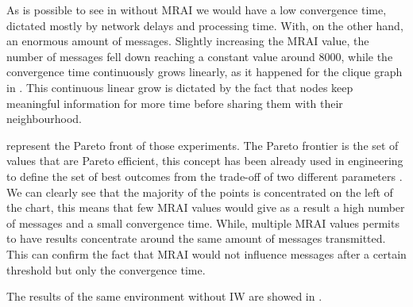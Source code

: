 As is possible to see in 
without \ac{MRAI} we would have a low convergence time, dictated mostly by
network delays and processing time. With, on the other hand, an enormous amount
of messages.
Slightly increasing the \ac{MRAI} value, the number of messages fell down
reaching a constant value around \num{8000}, while the convergence time
continuously grows linearly, as it happened for the clique graph in .
This continuous linear grow is dictated by the fact that nodes keep meaningful
information for more time before sharing them with their neighbourhood.

 represent the Pareto
front of those experiments.
The Pareto frontier is the set of values that are Pareto efficient, this concept
has been already used in engineering to define the set of best outcomes from
the trade-off of two different parameters \cite{goodarzi2014introduction}.
We can clearly see that the majority of the points is concentrated on the left
of the chart, this means that few \ac{MRAI} values would give as a result
a high number of messages and a small convergence time.
While, multiple \ac{MRAI} values permits to have results concentrate around the
same amount of messages transmitted.
This can confirm the fact that \ac{MRAI} would not influence messages
after a certain threshold but only the convergence time.

The results of the same environment without \ac{IW} are showed in
.

